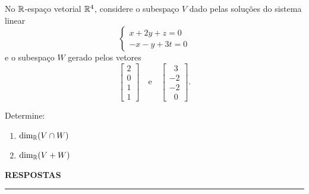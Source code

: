 \documentclass[12pt]{exam}
\begin{document}
    \begin{exercicio}
        No $\mathbb{R}$-espa\c{c}o vetorial $\mathbb{R}^4$, considere o subespa\c{c}o $V$ dado pelas solu\c{c}\~oes do sistema linear
        \[
            \begin{cases}
                x + 2y + z = 0\\
                -x -y + 3t = 0
            \end{cases}
        \]
        e o subespa\c{c}o $W$ gerado pelos vetores
        \[
            \begin{bmatrix}
                2\\
                0\\
                1\\
                1
            \end{bmatrix} \quad \mbox{e}\quad
            \begin{bmatrix}
                \phantom{x} 3\\
                -2\\
                -2\\
                \phantom{x} 0
            \end{bmatrix}.
        \]
        
        Determine:
        \begin{enumerate}[label={\alph*})]
            \item $\dim_{\mathbb{R}}(V \cap W)$
            
            \item $\dim_{\mathbb{R}}(V + W)$
        \end{enumerate}
    \end{exercicio}

    \newpage
    

    \begin{center}
        {\large\bf RESPOSTAS}
    \end{center}

    \hrule
    
    
\end{document}
